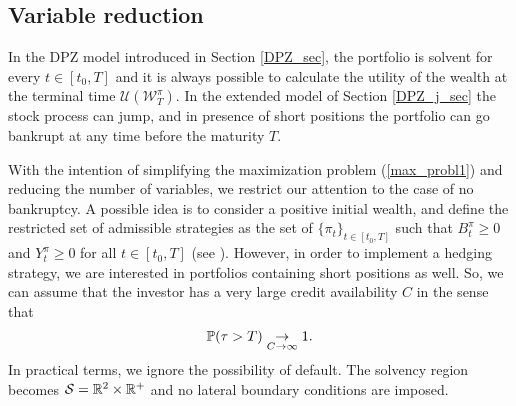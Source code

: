\subsection{Variable reduction}\label{variable_reduction}


In the DPZ model introduced in Section \ref{DPZ_sec}, the portfolio is solvent for every
$t \in [t_0,T]$ and it is always possible to calculate the utility 
of the wealth at the terminal time $\mathcal{U}(\mathcal{W}^{\pi}_T)$.
In the extended model of Section \ref{DPZ_j_sec} the stock process can jump, and in presence of short positions the portfolio can go bankrupt at any time before the maturity $T$. 

With the intention of simplifying the maximization problem (\ref{max_probl1}) and reducing the number of variables, 
we restrict our attention to the case of no bankruptcy.
A possible idea is to consider a positive initial wealth, and define the restricted set of admissible strategies as the set of $\{\pi_t\}_{t \in [t_0,T]}$ such that 
$B^{\pi}_t \geq 0$ and $Y^{\pi}_t \geq 0$ for all $t\in [t_0,T]$ (see \cite{Benth02}).
However, in order to implement a hedging strategy, we are interested in portfolios containing short positions as well.
So, we can assume that the investor has a very large credit availability $C$ in the sense that
\begin{equation}\label{P_tau}
 \mathbb{P}(\tau > T) \underset{C\to \infty}{\to} 1.
\end{equation}
In practical terms, we ignore the possibility of default. The solvency region becomes $\mathcal{S} = \mathbb{R}^2 \times \mathbb{R}^{+}$ and no lateral boundary conditions are imposed.

